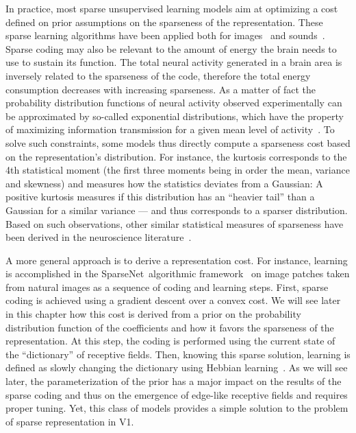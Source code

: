 \documentclass[a4paper, 11pt]{book}
\newcommand{\sparsenet}{{\sc SparseNet}}%
\begin{document}
In practice, most sparse unsupervised learning models aim at optimizing
a cost defined on prior assumptions on the sparseness of the representation.
These sparse learning algorithms have been applied both for images~\citep{Fyfe95,Olshausen96,Zibulevsky01,Perrinet03ieee,Rehn07,Doi07,Perrinet10shl}
and sounds~\citep{Lewicki00,Smith06}.
Sparse coding may also be relevant to the amount of energy the brain needs to use to sustain its function.
The total neural activity generated in a brain area is
inversely related to the sparseness of the code, therefore the total energy consumption decreases with increasing sparseness.
As a matter of fact the probability distribution functions of neural activity observed experimentally can be approximated by so-called exponential distributions, %
which have the property of maximizing information transmission for a given mean level of activity~\citep{Baddeley97}.
To solve such constraints, some models thus directly compute a sparseness cost based on the representation's distribution.
For instance, the kurtosis corresponds to the 4th statistical moment (the first three moments being in order the mean, variance and skewness)
and  measures how the statistics deviates from a Gaussian:
A positive kurtosis measures if this distribution has an ``heavier tail'' than a Gaussian for a similar variance --- and thus corresponds to a sparser distribution. Based  on such observations, other similar statistical measures of sparseness have been derived in the neuroscience literature~\citep{Vinje00}. %

A more general approach is to derive a representation cost.
For instance, learning is accomplished in the \sparsenet\ algorithmic framework~\citep{Olshausen97}
on image patches taken from natural images as a sequence of coding and learning steps.
First, sparse coding is achieved using a gradient descent over a convex cost. 
We will see later in this chapter how this cost is derived from a prior  on the probability distribution function of the coefficients and how it favors the sparseness of the representation.
At this step, the coding is performed using the current state of the ``dictionary'' of receptive fields.
Then, knowing this sparse solution,
learning is defined as slowly changing the dictionary using Hebbian learning~\citep{Hebb49}.
As we will see later, the parameterization of the prior
has a major impact on the results of the sparse coding and
thus on the emergence of edge-like receptive fields and requires proper tuning.
Yet, this class of models provides a simple solution to the problem of sparse representation in V1.
\end{document}
